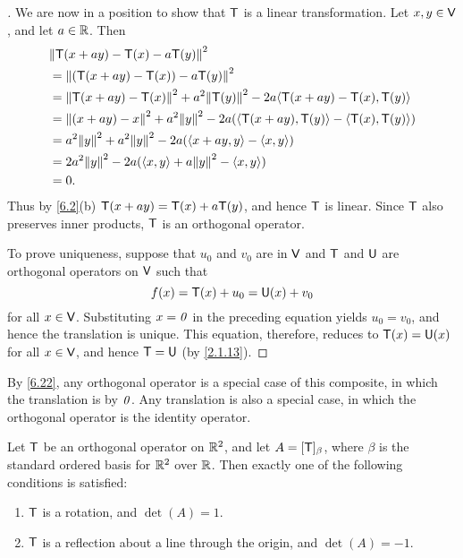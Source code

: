 \begin{proof}[]
  We are now in a position to show that \(\mathsf{T}\) is a linear transformation.
  Let \(x, y \in \mathsf{V}\), and let \(a \in \mathbb{R}\).
  Then
  \begin{align*}
     & \norm{\T(x + ay) - \T(x) - a \T(y)}^2                                                        \\
     & = \norm{(\T(x + ay) - \T(x)) - a \T(y)}^2                                                    \\
     & = \norm{\T(x + ay) - \T(x)}^2 + a^2 \norm{\T(y)}^2 - 2a \inn{\T(x + ay) - \T(x), \T(y)}      \\
     & = \norm{(x + ay) - x}^2 + a^2 \norm{y}^2 - 2a (\inn{\T(x + ay), \T(y)} - \inn{\T(x), \T(y)}) \\
     & = a^2 \norm{y}^2 + a^2 \norm{y}^2 - 2a (\inn{x + ay, y} - \inn{x, y})                        \\
     & = 2 a^2 \norm{y}^2 - 2a (\inn{x, y} + a \norm{y}^2 - \inn{x, y})                             \\
     & = 0.
  \end{align*}
  Thus by \cref{6.2}(b) \(\mathsf{T}(x + ay) = \mathsf{T}(x) + a \mathsf{T}(y)\), and hence \(\mathsf{T}\) is linear.
  Since \(\mathsf{T}\) also preserves inner products, \(\mathsf{T}\) is an orthogonal operator.

  To prove uniqueness, suppose that \(u_0\) and \(v_0\) are in \(\mathsf{V}\) and \(\mathsf{T}\) and \(\mathsf{U}\) are orthogonal operators on \(\mathsf{V}\) such that
  \[
    f(x) = \mathsf{T}(x) + u_0 = \mathsf{U}(x) + v_0
  \]
  for all \(x \in \mathsf{V}\).
  Substituting \(x = \mathit{0}\) in the preceding equation yields \(u_0 = v_0\), and hence the translation is unique.
  This equation, therefore, reduces to \(\mathsf{T}(x) = \mathsf{U}(x)\) for all \(x \in \mathsf{V}\), and hence \(\mathsf{T} = \mathsf{U}\) (by \cref{2.1.13}).
\end{proof}

\begin{note}
  By \cref{6.22}, any orthogonal operator is a special case of this composite, in which the translation is by \(\mathit{0}\).
  Any translation is also a special case, in which the orthogonal operator is the identity operator.
\end{note}

\begin{thm}\label{6.23}
  Let \(\mathsf{T}\) be an orthogonal operator on \(\mathbb{R}^2\), and let \(A = [\mathsf{T}]_{\beta}\), where \(\beta\) is the standard ordered basis for \(\mathbb{R}^2\) over \(\mathbb{R}\).
  Then exactly one of the following conditions is satisfied:
  \begin{enumerate}
    \item \(\mathsf{T}\) is a rotation, and \(\det(A) = 1\).
    \item \(\mathsf{T}\) is a reflection about a line through the origin, and \(\det(A) = -1\).
  \end{enumerate}
\end{thm}

